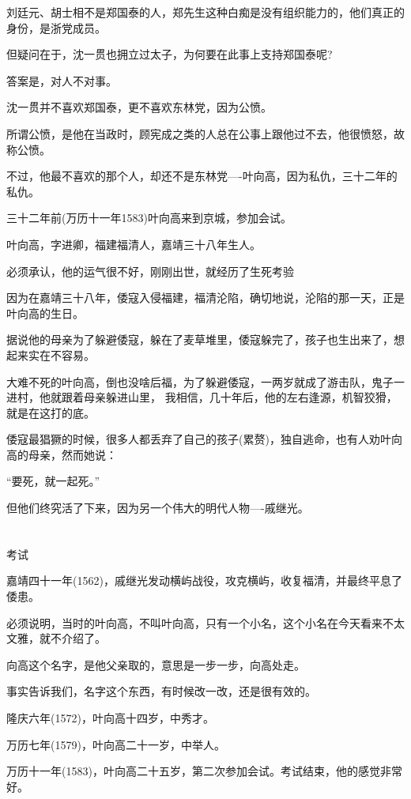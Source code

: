 \documentclass[11pt,a4paper,onecolumn]{article}
\begin{document}
刘廷元、胡士相不是郑国泰的人，郑先生这种白痴是没有组织能力的，他们真正的身份，是浙党成员。

但疑问在于，沈一贯也拥立过太子，为何要在此事上支持郑国泰呢?

答案是，对人不对事。

沈一贯并不喜欢郑国泰，更不喜欢东林党，因为公愤。

所谓公愤，是他在当政时，顾宪成之类的人总在公事上跟他过不去，他很愤怒，故称公愤。

不过，他最不喜欢的那个人，却还不是东林党----叶向高，因为私仇，三十二年的私仇。

三十二年前(万历十一年1583)叶向高来到京城，参加会试。

叶向高，字进卿，福建福清人，嘉靖三十八年生人。

必须承认，他的运气很不好，刚刚出世，就经历了生死考验

因为在嘉靖三十八年，倭寇入侵福建，福清沦陷，确切地说，沦陷的那一天，正是叶向高的生日。

据说他的母亲为了躲避倭寇，躲在了麦草堆里，倭寇躲完了，孩子也生出来了，想起来实在不容易。

大难不死的叶向高，倒也没啥后福，为了躲避倭寇，一两岁就成了游击队，鬼子一进村，他就跟着母亲躲进山里，
我相信，几十年后，他的左右逢源，机智狡猾，就是在这打的底。

倭寇最猖獗的时候，很多人都丢弃了自己的孩子(累赘)，独自逃命，也有人劝叶向高的母亲，然而她说：

``要死，就一起死。''

但他们终究活了下来，因为另一个伟大的明代人物----戚继光。

\section[\thesection]{}

考试

嘉靖四十一年(1562)，戚继光发动横屿战役，攻克横屿，收复福清，并最终平息了倭患。

必须说明，当时的叶向高，不叫叶向高，只有一个小名，这个小名在今天看来不太文雅，就不介绍了。

向高这个名字，是他父亲取的，意思是一步一步，向高处走。

事实告诉我们，名字这个东西，有时候改一改，还是很有效的。

隆庆六年(1572)，叶向高十四岁，中秀才。

万历七年(1579)，叶向高二十一岁，中举人。

万历十一年(1583)，叶向高二十五岁，第二次参加会试。考试结束，他的感觉非常好。
\end{document}
